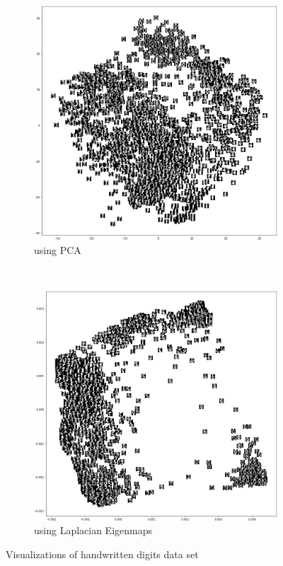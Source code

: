 \begin{figure}
	\begin{subfigure}[b]{0.4\textwidth}
		\includegraphics[width=\textwidth]{./figures/pca_2.png}
		\caption{using PCA}
	\end{subfigure}
	~
	\begin{subfigure}[b]{0.4\textwidth}
		\includegraphics[width=\textwidth]{./figures/lap_2.png}
		\caption{using Laplacian Eigenmaps}
	\end{subfigure}
	
	
	\caption{Visualizations of handwritten digits data set}
\end{figure}



